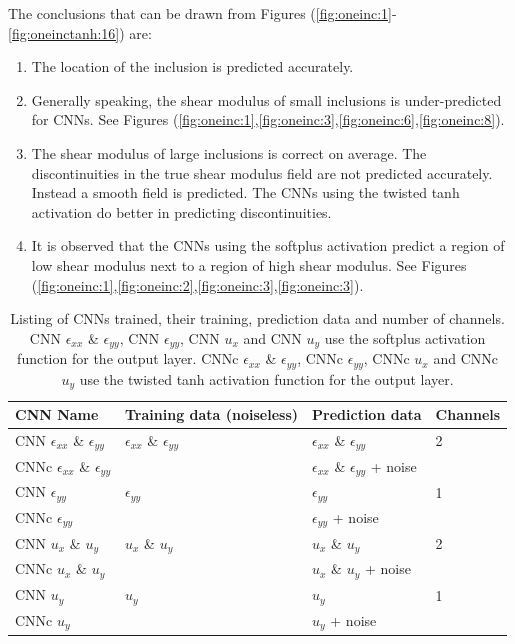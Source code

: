 \documentclass[12pt]{article}
\begin{document}
The conclusions that can be drawn from Figures (\ref{fig:oneinc:1}-\ref{fig:oneinctanh:16}) are:
\begin{enumerate}
\item{The location of the inclusion is predicted accurately.}
\item{Generally speaking, the shear modulus of small inclusions is under-predicted for CNNs. See Figures (\ref{fig:oneinc:1},\ref{fig:oneinc:3},\ref{fig:oneinc:6},\ref{fig:oneinc:8}).}
\item{The shear modulus of large inclusions is correct on average. The discontinuities in the true shear modulus field are not predicted accurately. Instead a smooth field is predicted. The CNNs using the twisted tanh activation do better in predicting discontinuities.}
\item{It is observed that the CNNs using the softplus activation predict a region of low shear modulus next to a region of high shear modulus. See Figures (\ref{fig:oneinc:1},\ref{fig:oneinc:2},\ref{fig:oneinc:3},\ref{fig:oneinc:3}).}
\end{enumerate}
%
\begin{center}
\begin{table}
  \centering
  \begin{tabular}{|p{3cm}|p{2cm}|p{3cm}|p{1.5cm}|}
    \hline
    CNN Name & Training data (noiseless) & Prediction data & Channels\\
    \hline
    CNN $\epsilon_{xx}$ \& $\epsilon_{yy}$ &  $\epsilon_{xx}$ \& $\epsilon_{yy}$ & $\epsilon_{xx}$ \& $\epsilon_{yy}$ & 2\\
    CNNc $\epsilon_{xx}$ \& $\epsilon_{yy}$ &  & $\epsilon_{xx}$ \& $\epsilon_{yy}$ + noise & \\
    \hline
    CNN $\epsilon_{yy}$ & $\epsilon_{yy}$ & $\epsilon_{yy}$ & 1\\
    CNNc $\epsilon_{yy}$ &  & $\epsilon_{yy}$ + noise & \\
    \hline
    CNN $u_x$ \& $u_y$ & $u_x$ \& $u_y$ & $u_x$ \& $u_y$ & 2\\
    CNNc $u_x$ \& $u_y$&  & $u_x$ \& $u_y$ + noise & \\    
    \hline
    CNN $u_y$  & $u_y$ & $u_y$ & 1\\
    CNNc $u_y$ &  & $u_y$ + noise & \\
    \hline
  \end{tabular}
  \caption{\label{tab:cnnone:io} Listing of CNNs trained, their training, prediction data and number of channels. CNN $\epsilon_{xx}$ \& $\epsilon_{yy}$, CNN $\epsilon_{yy}$, CNN $u_x$  and CNN $u_y$ use the softplus activation function for the output layer. CNNc $\epsilon_{xx}$ \& $\epsilon_{yy}$, CNNc $\epsilon_{yy}$, CNNc $u_x$  and CNNc $u_y$ use the twisted tanh activation function for the output layer.}
\end{table}
\end{center}
\end{document}
